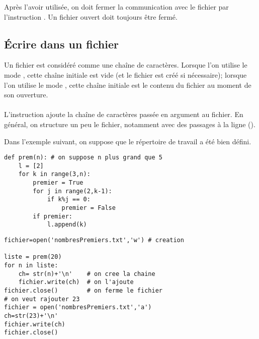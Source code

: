 Après l'avoir utilisée, on doit fermer la communication avec le fichier par l'instruction . Un fichier ouvert doit toujours être fermé.
\subsection{Écrire dans un fichier}
Un fichier est considéré comme une chaîne de caractères. Lorsque l'on utilise le mode , cette chaîne initiale est vide (et le fichier est créé si nécessaire); lorsque l'on utilise le mode , cette chaîne initiale est le contenu du fichier au moment de son ouverture.\\
\\
L'instruction  ajoute la chaîne de caractères passée en argument au fichier. En général, on structure un peu le fichier, notamment avec des passages à la ligne (). 

Dans l'exemple suivant, on suppose que le répertoire de travail a été bien défini.
\begin{lstlisting}
def prem(n): # on suppose n plus grand que 5
    l = [2]
    for k in range(3,n):
        premier = True
        for j in range(2,k-1):
            if k%j == 0:
                premier = False
        if premier:
            l.append(k)
\end{lstlisting}
\begin{lstlisting}[frame=lines, caption={Les premiers nombres premiers}]
fichier=open('nombresPremiers.txt','w') # creation

liste = prem(20)
for n in liste:
    ch= str(n)+'\n'    # on cree la chaine
    fichier.write(ch)  # on l'ajoute
fichier.close()        # on ferme le fichier
# on veut rajouter 23
fichier = open('nombresPremiers.txt','a')
ch=str(23)+'\n'
fichier.write(ch)
fichier.close()
\end{lstlisting}
